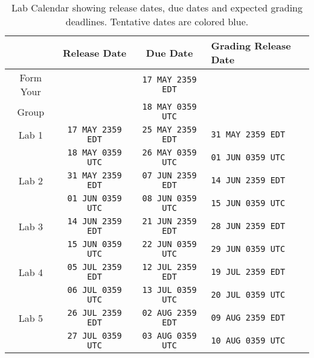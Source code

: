 %
\begin{table}
  \centering
  \begin{tabular}{c|c|c|l}
      & Release Date & Due Date & Grading Release Date\\ \hline
    Form Your
      &
      & \texttt{17 MAY 2359 EDT}
      & \\
    Group
      &
      & \texttt{18 MAY 0359 UTC}
      & \\ \hline
    Lab 1
      & \texttt{17 MAY 2359 EDT}
      & \texttt{25 MAY 2359 EDT}
      & {\color{blue}\texttt{31 MAY 2359 EDT}}\\
      & \texttt{18 MAY 0359 UTC}
      & \texttt{26 MAY 0359 UTC}
      & {\color{blue}\texttt{01 JUN 0359 UTC}}\\ \hline
    Lab 2
      & {\color{blue}\texttt{31 MAY 2359 EDT}}
      & {\color{blue}\texttt{07 JUN 2359 EDT}}
      & {\color{blue}\texttt{14 JUN 2359 EDT}}\\
      & {\color{blue}\texttt{01 JUN 0359 UTC}}
      & {\color{blue}\texttt{08 JUN 0359 UTC}}
      & {\color{blue}\texttt{15 JUN 0359 UTC}}\\ \hline
    Lab 3
      & {\color{blue}\texttt{14 JUN 2359 EDT}}
      & {\color{blue}\texttt{21 JUN 2359 EDT}}
      & {\color{blue}\texttt{28 JUN 2359 EDT}}\\
      & {\color{blue}\texttt{15 JUN 0359 UTC}}
      & {\color{blue}\texttt{22 JUN 0359 UTC}}
      & {\color{blue}\texttt{29 JUN 0359 UTC}}\\ \hline
    Lab 4
      & {\color{blue}\texttt{05 JUL 2359 EDT}}
      & {\color{blue}\texttt{12 JUL 2359 EDT}}
      & {\color{blue}\texttt{19 JUL 2359 EDT}}\\
      & {\color{blue}\texttt{06 JUL 0359 UTC}}
      & {\color{blue}\texttt{13 JUL 0359 UTC}}
      & {\color{blue}\texttt{20 JUL 0359 UTC}}\\ \hline
    Lab 5
      & {\color{blue}\texttt{26 JUL 2359 EDT}}
      & {\color{blue}\texttt{02 AUG 2359 EDT}}
      & {\color{blue}\texttt{09 AUG 2359 EDT}}\\
      & {\color{blue}\texttt{27 JUL 0359 UTC}}
      & {\color{blue}\texttt{03 AUG 0359 UTC}}
      & {\color{blue}\texttt{10 AUG 0359 UTC}}
  \end{tabular}
  \caption[Lab Calendar]{%
    Lab Calendar showing release dates, due dates and expected grading
    deadlines. Tentative dates are colored blue.
  }
  \label{tab:labcalendar}
\end{table}
